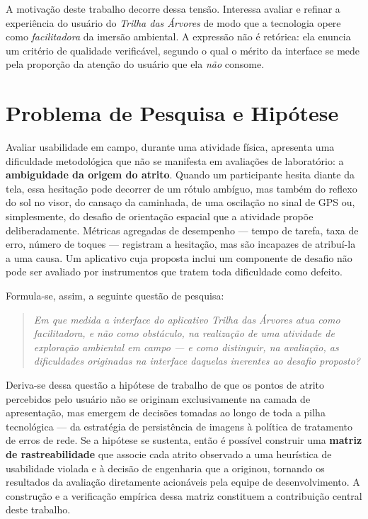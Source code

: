 A motivação deste trabalho decorre dessa tensão. Interessa avaliar e refinar a
experiência do usuário do \textit{Trilha das Árvores} de modo que a tecnologia
opere como \emph{facilitadora} da imersão ambiental. A expressão não é
retórica: ela enuncia um critério de qualidade verificável, segundo o qual o
mérito da interface se mede pela proporção da atenção do usuário que ela
\emph{não} consome.

\section{Problema de Pesquisa e Hipótese}
\label{sec:problema}

Avaliar usabilidade em campo, durante uma atividade física, apresenta uma
dificuldade metodológica que não se manifesta em avaliações de laboratório: a
\textbf{ambiguidade da origem do atrito}. Quando um participante hesita diante da
tela, essa hesitação pode decorrer de um rótulo ambíguo, mas também do reflexo do
sol no visor, do cansaço da caminhada, de uma oscilação no sinal de GPS ou,
simplesmente, do desafio de orientação espacial que a atividade propõe
deliberadamente. Métricas agregadas de desempenho --- tempo de tarefa, taxa de
erro, número de toques --- registram a hesitação, mas são incapazes de atribuí-la
a uma causa. Um aplicativo cuja proposta inclui um componente de desafio não pode
ser avaliado por instrumentos que tratem toda dificuldade como defeito.

Formula-se, assim, a seguinte questão de pesquisa:

\begin{quote}
\textit{Em que medida a interface do aplicativo Trilha das Árvores atua como
facilitadora, e não como obstáculo, na realização de uma atividade de exploração
ambiental em campo --- e como distinguir, na avaliação, as dificuldades
originadas na interface daquelas inerentes ao desafio proposto?}
\end{quote}

Deriva-se dessa questão a hipótese de trabalho de que os pontos de atrito
percebidos pelo usuário não se originam exclusivamente na camada de apresentação,
mas emergem de decisões tomadas ao longo de toda a pilha tecnológica --- da
estratégia de persistência de imagens à política de tratamento de erros de rede.
Se a hipótese se sustenta, então é possível construir uma \textbf{matriz de
rastreabilidade} que associe cada atrito observado a uma heurística de usabilidade
violada e à decisão de engenharia que a originou, tornando os resultados da
avaliação diretamente acionáveis pela equipe de desenvolvimento. A construção e a
verificação empírica dessa matriz constituem a contribuição central deste
trabalho.

